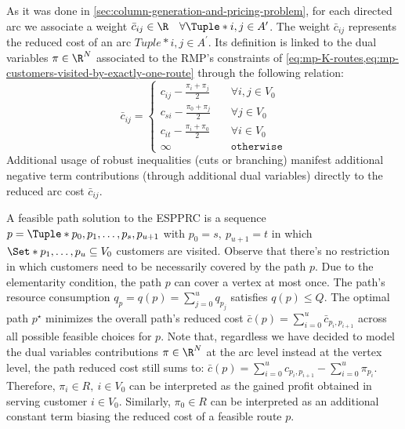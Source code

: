 As it was done in \cref{sec:column-generation-and-pricing-problem},
for each directed arc we associate a weight
$\bar{c}_{ij} \in \R \quad \forall \Tuple*{i, j} \in A^\prime$.
The weight $\bar{c}_{ij}$ represents the reduced cost of an arc $Tuple*{i, j} \in A^\prime$.
Its definition is linked to the dual variables $\pi \in \R^N$ associated to
the RMP's constraints of \cref{eq:mp-K-routes,eq:mp-customers-visited-by-exactly-one-route}
through the following relation:
\begin{equation}
	\bar{c}_{ij} = \begin{cases}
		c_{ij} - \frac{\pi_i + \pi_j}{2} & \quad \forall i, j \in V_0 \\
		c_{si} - \frac{\pi_0 + \pi_j}{2} & \quad \forall j \in V_0    \\
		c_{it} - \frac{\pi_i + \pi_0}{2} & \quad \forall i \in V_0    \\
		\infty                           & \quad \texttt{otherwise}
	\end{cases}
\end{equation}
Additional usage of robust inequalities (cuts or branching) manifest
additional negative term contributions (through additional dual variables)
directly to the reduced arc cost $\bar{c}_{ij}$.

A feasible path solution to the ESPPRC is a sequence $p = \Tuple*{p_0, p_1, \dots, p_s, p_{u+1}}$
with $p_0 = s, \ p_{u + 1} = t$
in which $\Set*{p_1, \dots, p_u} \subseteq V_0$ customers are visited.
Observe that there's no restriction in which customers need to be necessarily covered
by the path $p$.
Due to the elementarity condition, the path $p$ can cover a vertex at most once.
The path's resource consumption $q_p = q(p) = \sum_{j=0}^{u} q_{p_j}$
satisfies $q(p) \le Q$.
The optimal path $p^\star$ minimizes the overall path's reduced cost
$\bar{c}(p) = \sum_{i=0}^{u} \bar{c}_{p_i,p_{i+1}}$ across all
possible feasible choices for $p$.
Note that, regardless we have decided to model
the dual variables contributions $\pi \in \R^N$
at the arc level instead at the vertex level,
the path reduced cost still sums to:
$\bar{c}(p) = \sum_{i=0}^{u} c_{p_i,p_{i+1}} - \sum_{i=0}^{u} \pi_{p_i}$.
Therefore, $\pi_i \in R,\ i \in V_0$ can be interpreted as the
gained profit obtained in serving customer $i \in V_0$.
Similarly,
$\pi_0 \in R$ can be interpreted as an additional constant term
biasing the reduced cost of a feasible route $p$.

\medskip

